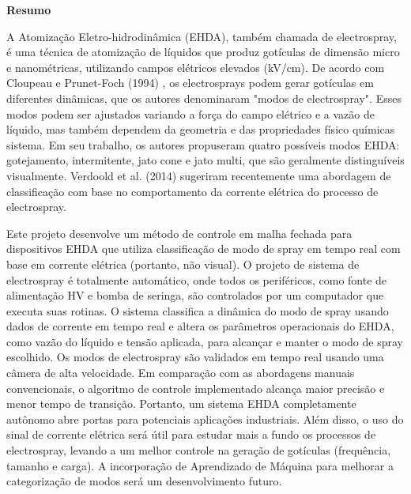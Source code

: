 
\begin{center}
\huge{{\bf Resumo}}
\vspace{2cm}
\end{center}

A Atomização Eletro-hidrodinâmica (EHDA), também chamada de electrospray, é uma técnica de atomização de líquidos que produz gotículas de dimensão micro e nanométricas, utilizando campos elétricos elevados (kV/cm).
De acordo com Cloupeau e Prunet-Foch\cite{prunet} (1994) , os electrosprays podem gerar gotículas em diferentes dinâmicas, que os autores denominaram "modos de electrospray". 
 Esses modos podem ser ajustados variando a força do campo elétrico e a vazão de líquido, mas também dependem da geometria e das propriedades físico químicas sistema. 
 Em seu trabalho, os autores propuseram quatro possíveis modos EHDA: gotejamento, intermitente, jato cone e jato multi, que são geralmente distinguíveis visualmente.
 Verdoold et al.\cite{Sjaaks} (2014) sugeriram recentemente uma abordagem de classificação com base no comportamento da corrente elétrica do processo de electrospray.

Este projeto desenvolve um método de controle em malha fechada para dispositivos EHDA que utiliza classificação de modo de spray em tempo real com base em corrente elétrica (portanto, não visual). 
O projeto de sistema de electrospray é totalmente automático, onde todos os periféricos, como fonte de alimentação HV e bomba de seringa, são controlados por um computador que executa suas rotinas. 
O sistema classifica a dinâmica do modo de spray usando dados de corrente em tempo real e altera os parâmetros operacionais do EHDA, como vazão do líquido e tensão aplicada, para alcançar e manter o modo de spray escolhido. 
Os modos de electrospray são validados em tempo real usando uma câmera de alta velocidade.
Em comparação com as abordagens manuais convencionais, o algoritmo de controle implementado alcança maior precisão e menor tempo de transição. 
Portanto, um sistema EHDA completamente autônomo abre portas para potenciais aplicações industriais. 
Além disso, o uso do sinal de corrente elétrica será útil para estudar mais a fundo os processos de electrospray, levando a um melhor controle na geração de gotículas (frequência, tamanho e carga). 
A incorporação de Aprendizado de Máquina para melhorar a categorização de modos será um desenvolvimento futuro.

\clearpage
\thispagestyle{empty}
\cleardoublepage

